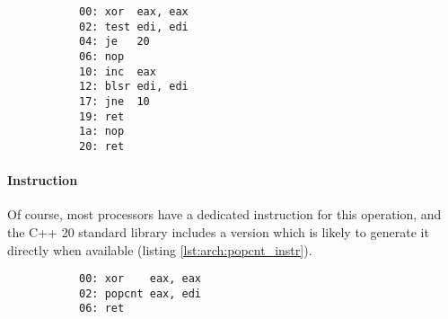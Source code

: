 
\begin{figure}[ht]
    \vspace{-\baselineskip}
    \begin{subfigure}[t]{0.65\textwidth}
        
    \end{subfigure}
    \hspace*{\fill}
    \begin{subfigure}[t]{0.3\textwidth}
        \begin{lstlisting}[style=x86]
00: xor  eax, eax
02: test edi, edi
04: je   20
06: nop
10: inc  eax
12: blsr edi, edi
17: jne  10
19: ret
1a: nop
20: ret
        \end{lstlisting}
    \end{subfigure}
    \vspace{-2\baselineskip}
\end{figure}

\paragraph{Instruction}

Of course, most processors have a dedicated instruction for this operation, and
the C++ 20 standard library includes a version which is likely to generate it
directly when available (listing \ref{lst:arch:popcnt_instr}).

\begin{figure}[ht]
    \centering
    \vspace{-\baselineskip}
    \begin{subfigure}[t]{0.65\textwidth}
        
    \end{subfigure}
    \hspace*{\fill}
    \begin{subfigure}[t]{0.3\textwidth}
        \begin{lstlisting}[style=x86]
00: xor    eax, eax
02: popcnt eax, edi
06: ret
        \end{lstlisting}
    \end{subfigure}
    \vspace{-2\baselineskip}
\end{figure}

